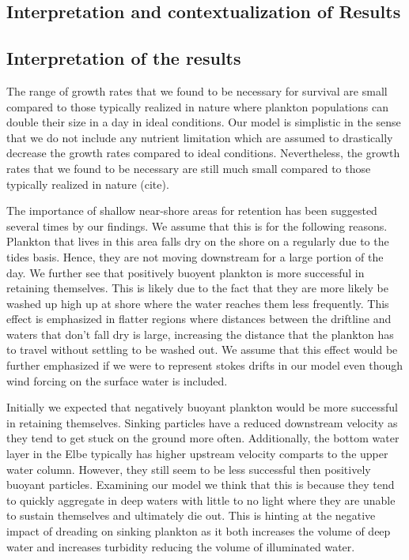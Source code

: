 \subsection*{Interpretation and contextualization of Results}

\subsection*{Interpretation of the results}
The range of growth rates that we found to be necessary for survival are small compared to those typically realized in nature where plankton populations can double their size in a day in ideal conditions.
Our model is simplistic in the sense that we do not include any nutrient limitation which are assumed to drastically decrease the growth rates compared to ideal conditions. 
Nevertheless, the growth rates that we found to be necessary are still much small compared to those typically realized in nature (cite).

The importance of shallow near-shore areas for retention has been suggested several times by our findings. 
We assume that this is for the following reasons.
Plankton that lives in this area falls dry on the shore on a regularly due to the tides basis. Hence, they are not moving downstream for a large portion of the day.
We further see that positively buoyent plankton is more successful in retaining themselves. 
This is likely due to the fact that they are more likely be washed up high up at shore where the water reaches them less frequently.
This effect is emphasized in flatter regions where distances between the driftline and waters that don't fall dry is large, increasing the distance that the plankton has to travel without settling to be washed out.
We assume that this effect would be further emphasized if we were to represent stokes drifts in our model even though wind forcing on the surface water is included.

Initially we expected that negatively buoyant plankton would be more successful in retaining themselves.
Sinking particles have a reduced downstream velocity as they tend to get stuck on the ground more often.
Additionally, the bottom water layer in the Elbe typically has higher upstream velocity comparts to the upper water column.
However, they still seem to be less successful then positively buoyant particles.
Examining our model we think  that this is because they tend to quickly aggregate in deep waters with little to no light where they are unable to sustain themselves and ultimately die out.
This is hinting at the negative impact of dreading on sinking plankton as it both increases the volume of deep water and increases turbidity reducing the volume of illuminated water.

